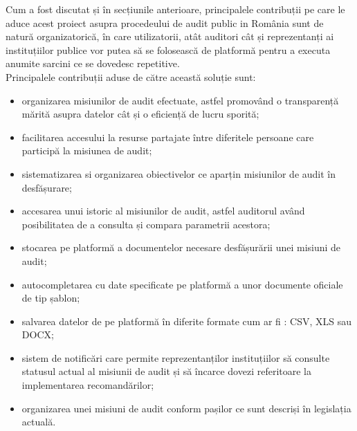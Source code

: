 Cum a fost discutat și în secțiunile anterioare, principalele contribuții pe care le aduce acest proiect asupra procedeului de audit public in România sunt de natură organizatorică, în care utilizatorii, atât auditori cât și reprezentanți ai instituțiilor publice vor putea să se folosească de platformă pentru a executa anumite sarcini ce se dovedesc repetitive.\\
Principalele contribuții aduse de către această soluție sunt:
\begin{itemize}
	
	\item  organizarea misiunilor de audit efectuate, astfel promovând o transparență mărită asupra datelor cât și o eficiență de lucru sporită;
	
	\item facilitarea accesului la resurse partajate între diferitele persoane care participă la misiunea de audit;
	
	\item sistematizarea  si organizarea obiectivelor ce aparțin misiunilor de audit în desfășurare;
	
	\item accesarea unui istoric al misiunilor de audit, astfel auditorul având posibilitatea de a consulta și compara parametrii acestora;
	
	\item stocarea pe platformă a documentelor necesare desfășurării unei misiuni de audit;
	
	\item autocompletarea cu date specificate pe platformă a unor documente oficiale de tip șablon;
	
	\item salvarea datelor de pe platformă în diferite formate cum ar fi : CSV, XLS sau DOCX;
	
	\item sistem de notificări care permite reprezentanților instituțiilor să consulte statusul actual al misiunii de audit și să încarce dovezi referitoare la implementarea recomandărilor;
	
	\item organizarea unei misiuni de audit conform pașilor ce sunt descriși în legislația actuală.
	
\end{itemize}



